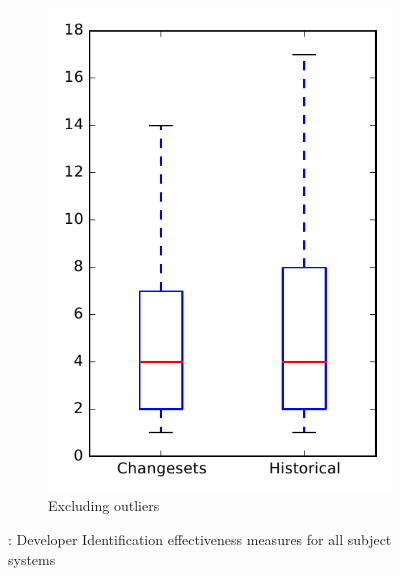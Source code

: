\begin{figure}
\begin{subfigure}{.4\textwidth}
        \includegraphics[height=0.4\textheight]{figures/dit/rq2_overview_no_outlier}
        \caption{Excluding outliers}\label{fig:dit:rq2:overview_no_outlier}
    \end{subfigure}
\caption{\dtwo: Developer Identification effectiveness measures for all subject systems}
\label{fig:dit:rq2:overview}
\end{figure}
